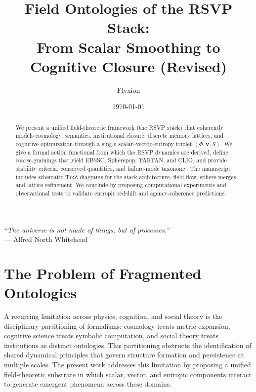 \documentclass[11pt]{article}
\title{Field Ontologies of the RSVP Stack:\\From Scalar Smoothing to Cognitive Closure (Revised)}
\author{Flyxion}
\date{\today}
\theoremstyle{definition}
\theoremstyle{remark}
\begin{document}
\maketitle

\begin{flushright}
\emph{“The universe is not made of things, but of processes.”} \\ — Alfred North Whitehead \cite{Whitehead1929}
\end{flushright}
\vspace{1em}

\begin{abstract}
We present a unified field-theoretic framework (the RSVP stack) that coherently models cosmology, semantics, institutional closure, discrete memory lattices, and cognitive optimization through a single scalar–vector–entropy triplet $(\Phi,\mathbf{v},S)$. We give a formal action functional from which the RSVP dynamics are derived, define coarse-grainings that yield EBSSC, Spherepop, TARTAN, and CLIO, and provide stability criteria, conserved quantities, and failure-mode taxonomy. The manuscript includes schematic TikZ diagrams for the stack architecture, field flow, sphere merges, and lattice refinement. We conclude by proposing computational experiments and observational tests to validate entropic redshift and agency-coherence predictions.
\end{abstract}


\section{The Problem of Fragmented Ontologies}
A recurring limitation across physics, cognition, and social theory is the disciplinary partitioning of formalisms: cosmology treats metric expansion, cognitive science treats symbolic computation, and social theory treats institutions as distinct ontologies. This partitioning obstructs the identification of shared dynamical principles that govern structure formation and persistence at multiple scales. The present work addresses this limitation by proposing a unified field-theoretic substrate in which scalar, vector, and entropic components interact to generate emergent phenomena across these domains.
\end{document}
